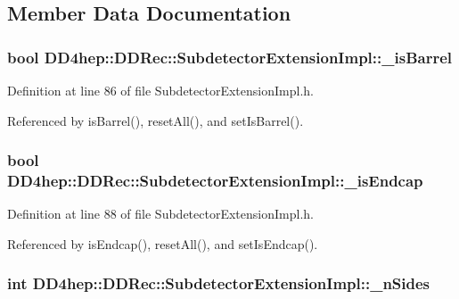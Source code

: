 \subsection{Member Data Documentation}
\hypertarget{class_d_d4hep_1_1_d_d_rec_1_1_subdetector_extension_impl_aca8d64e7e01c75f25020bcb13b68ba76}{
\subsubsection[{\_\-isBarrel}]{\setlength{\rightskip}{0pt plus 5cm}bool {\bf DD4hep::DDRec::SubdetectorExtensionImpl::\_\-isBarrel}}}
\label{class_d_d4hep_1_1_d_d_rec_1_1_subdetector_extension_impl_aca8d64e7e01c75f25020bcb13b68ba76}


Definition at line 86 of file SubdetectorExtensionImpl.h.

Referenced by isBarrel(), resetAll(), and setIsBarrel().\hypertarget{class_d_d4hep_1_1_d_d_rec_1_1_subdetector_extension_impl_ab4ac574b15b70218b3c101314002d390}{
\subsubsection[{\_\-isEndcap}]{\setlength{\rightskip}{0pt plus 5cm}bool {\bf DD4hep::DDRec::SubdetectorExtensionImpl::\_\-isEndcap}}}
\label{class_d_d4hep_1_1_d_d_rec_1_1_subdetector_extension_impl_ab4ac574b15b70218b3c101314002d390}


Definition at line 88 of file SubdetectorExtensionImpl.h.

Referenced by isEndcap(), resetAll(), and setIsEndcap().\hypertarget{class_d_d4hep_1_1_d_d_rec_1_1_subdetector_extension_impl_a5f3f5b1a0cc55c564536556accc0579a}{
\subsubsection[{\_\-nSides}]{\setlength{\rightskip}{0pt plus 5cm}int {\bf DD4hep::DDRec::SubdetectorExtensionImpl::\_\-nSides}}}
\label{class_d_d4hep_1_1_d_d_rec_1_1_subdetector_extension_impl_a5f3f5b1a0cc55c564536556accc0579a}


